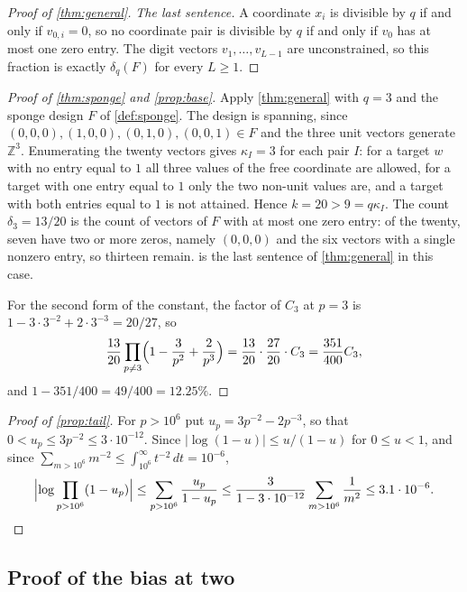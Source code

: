 \documentclass[11pt]{amsart}
\theoremstyle{definition}
\theoremstyle{remark}
\begin{document}
\begin{proof}[Proof of \cref{thm:general}]
\emph{The last sentence.} A coordinate $x_i$ is divisible by $q$ if and only if $v_{0,i}=0$, so no coordinate pair is divisible by $q$ if and only if $v_0$ has at most one zero entry. The digit vectors $v_1,\dots,v_{L-1}$ are unconstrained, so this fraction is exactly $\delta_q(F)$ for every $L\ge1$. \qedhere
\end{proof}

\begin{proof}[Proof of \cref{thm:sponge} and \cref{prop:base}]
Apply \cref{thm:general} with $q=3$ and the sponge design $F$ of \cref{def:sponge}. The design is spanning, since $(0,0,0),(1,0,0),(0,1,0),(0,0,1)\in F$ and the three unit vectors generate $\mathbb Z^3$. Enumerating the twenty vectors gives $\kappa_I=3$ for each pair $I$: for a target $w$ with no entry equal to $1$ all three values of the free coordinate are allowed, for a target with one entry equal to $1$ only the two non-unit values are, and a target with both entries equal to $1$ is not attained. Hence $k=20>9=q\kappa_I$. The count $\delta_3=13/20$ is the count of vectors of $F$ with at most one zero entry: of the twenty, seven have two or more zeros, namely $(0,0,0)$ and the six vectors with a single nonzero entry, so thirteen remain.  is the last sentence of \cref{thm:general} in this case.

For the second form of the constant, the factor of $C_3$ at $p=3$ is $1-3\cdot3^{-2}+2\cdot3^{-3}=20/27$, so
\[
\frac{13}{20}\prod_{p\ne3}\Bigl(1-\frac3{p^2}+\frac2{p^3}\Bigr)
=\frac{13}{20}\cdot\frac{27}{20}\cdot C_3=\frac{351}{400}C_3,
\]
and $1-351/400=49/400=12.25\%$. \qedhere
\end{proof}

\begin{proof}[Proof of \cref{prop:tail}]
For $p>10^6$ put $u_p=3p^{-2}-2p^{-3}$, so that $0<u_p\le3p^{-2}\le3\cdot10^{-12}$. Since $|\log(1-u)|\le u/(1-u)$ for $0\le u<1$, and since $\sum_{m>10^{6}}m^{-2}\le\int_{10^{6}}^{\infty}t^{-2}\,dt=10^{-6}$,
\[
\Bigl|\log\prod_{p>10^{6}}(1-u_p)\Bigr|
\le\sum_{p>10^{6}}\frac{u_p}{1-u_p}
\le\frac{3}{1-3\cdot10^{-12}}\sum_{m>10^{6}}\frac1{m^{2}}
\le3.1\cdot10^{-6}. \qedhere
\]
\end{proof}

\subsection*{Proof of the bias at two}
\end{document}
